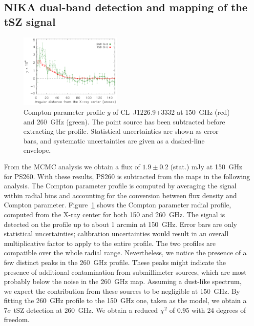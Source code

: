 \documentclass[twocolumn,traditabstract]{aa}
\begin{document}
\subsection{NIKA dual-band detection and mapping of the tSZ signal}\label{sec:dual_band_detection}
	\begin{figure}[h]
	\centering
	\includegraphics[width=0.45\textwidth]{Figure/y_profile.pdf}
	\caption{Compton parameter profile $y$ of \mbox{CL~J1226.9+3332} at 150~GHz (red) and 260~GHz (green). The point source has been subtracted before extracting the profile. Statistical uncertainties are shown as error bars, and systematic uncertainties are given as a dashed-line envelope.}
        \label{fig:y_profile}
	\end{figure}
From the MCMC analysis we obtain a flux of $1.9\pm 0.2$ (stat.) mJy at 150~GHz for PS260. With these results, PS260 is subtracted from the maps in the following analysis. The Compton parameter profile is computed by averaging the signal within radial bins and accounting for the conversion between flux density and Compton parameter. Figure~\ref{fig:y_profile} shows the Compton parameter radial profile, computed from the \mbox{X-ray} center for both 150 and 260~GHz. The signal is detected on the profile up to about 1 arcmin at 150~GHz. Error bars are only statistical uncertainties; calibration uncertainties would result in an overall multiplicative factor to apply to the entire profile. The two profiles are compatible over the whole radial range. Nevertheless, we notice the presence of a few distinct peaks in the 260~GHz profile. These peaks might indicate the presence of additional contamination from submillimeter sources, which are most probably below the noise in the 260~GHz map. Assuming a dust-like spectrum, we expect the contribution from these sources to be negligible at 150~GHz. By fitting the 260~GHz profile to the 150~GHz one, taken as the model, we obtain a 7$\sigma$ tSZ detection at 260~GHz. We obtain a reduced $\chi^2$ of 0.95 with 24 degrees of freedom.
\end{document}
